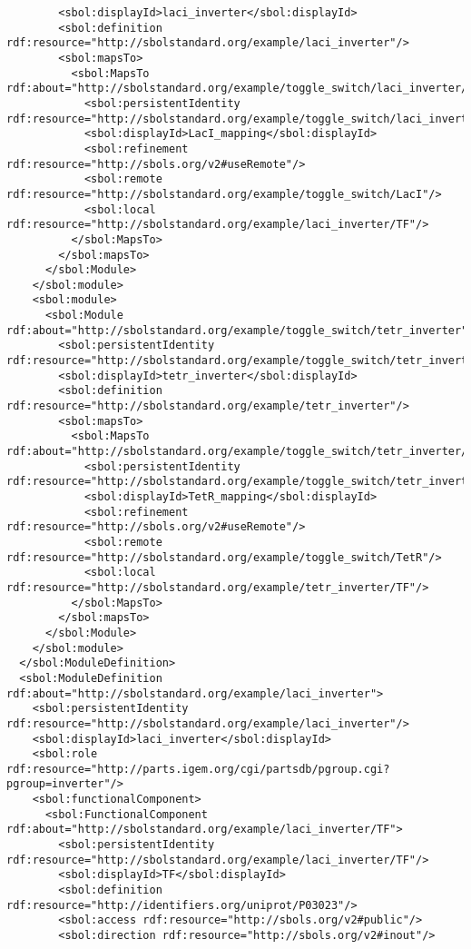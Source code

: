 \begin{lstlisting}
        <sbol:displayId>laci_inverter</sbol:displayId>
        <sbol:definition rdf:resource="http://sbolstandard.org/example/laci_inverter"/>
        <sbol:mapsTo>
          <sbol:MapsTo rdf:about="http://sbolstandard.org/example/toggle_switch/laci_inverter/LacI_mapping">
            <sbol:persistentIdentity rdf:resource="http://sbolstandard.org/example/toggle_switch/laci_inverter/LacI_mapping"/>
            <sbol:displayId>LacI_mapping</sbol:displayId>
            <sbol:refinement rdf:resource="http://sbols.org/v2#useRemote"/>
            <sbol:remote rdf:resource="http://sbolstandard.org/example/toggle_switch/LacI"/>
            <sbol:local rdf:resource="http://sbolstandard.org/example/laci_inverter/TF"/>
          </sbol:MapsTo>
        </sbol:mapsTo>
      </sbol:Module>
    </sbol:module>
    <sbol:module>
      <sbol:Module rdf:about="http://sbolstandard.org/example/toggle_switch/tetr_inverter">
        <sbol:persistentIdentity rdf:resource="http://sbolstandard.org/example/toggle_switch/tetr_inverter"/>
        <sbol:displayId>tetr_inverter</sbol:displayId>
        <sbol:definition rdf:resource="http://sbolstandard.org/example/tetr_inverter"/>
        <sbol:mapsTo>
          <sbol:MapsTo rdf:about="http://sbolstandard.org/example/toggle_switch/tetr_inverter/TetR_mapping">
            <sbol:persistentIdentity rdf:resource="http://sbolstandard.org/example/toggle_switch/tetr_inverter/TetR_mapping"/>
            <sbol:displayId>TetR_mapping</sbol:displayId>
            <sbol:refinement rdf:resource="http://sbols.org/v2#useRemote"/>
            <sbol:remote rdf:resource="http://sbolstandard.org/example/toggle_switch/TetR"/>
            <sbol:local rdf:resource="http://sbolstandard.org/example/tetr_inverter/TF"/>
          </sbol:MapsTo>
        </sbol:mapsTo>
      </sbol:Module>
    </sbol:module>
  </sbol:ModuleDefinition>
  <sbol:ModuleDefinition rdf:about="http://sbolstandard.org/example/laci_inverter">
    <sbol:persistentIdentity rdf:resource="http://sbolstandard.org/example/laci_inverter"/>
    <sbol:displayId>laci_inverter</sbol:displayId>
    <sbol:role rdf:resource="http://parts.igem.org/cgi/partsdb/pgroup.cgi?pgroup=inverter"/>
    <sbol:functionalComponent>
      <sbol:FunctionalComponent rdf:about="http://sbolstandard.org/example/laci_inverter/TF">
        <sbol:persistentIdentity rdf:resource="http://sbolstandard.org/example/laci_inverter/TF"/>
        <sbol:displayId>TF</sbol:displayId>
        <sbol:definition rdf:resource="http://identifiers.org/uniprot/P03023"/>
        <sbol:access rdf:resource="http://sbols.org/v2#public"/>
        <sbol:direction rdf:resource="http://sbols.org/v2#inout"/>

\end{lstlisting}
